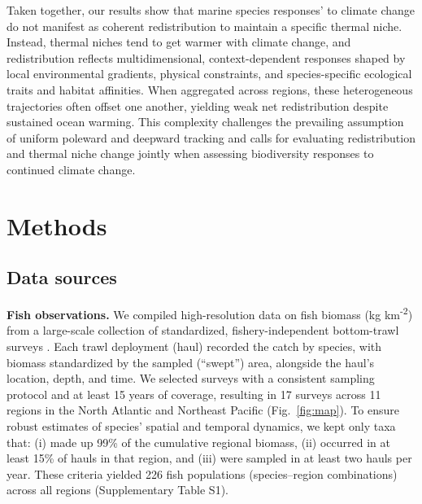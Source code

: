 \documentclass[pdflatex,sn-nature,referee]{sn-jnl}%
\begin{document}
Taken together, our results show that marine species responses' to climate change do not manifest as coherent redistribution to maintain a specific thermal niche. Instead, thermal niches tend to get warmer with climate change, and redistribution reflects multidimensional, context-dependent responses shaped by local environmental gradients, physical constraints, and species-specific ecological traits and habitat affinities. When aggregated across regions, these heterogeneous trajectories often offset one another, yielding weak net redistribution despite sustained ocean warming. This complexity challenges the prevailing assumption of uniform poleward and deepward tracking and calls for evaluating redistribution and thermal niche change jointly when assessing biodiversity responses to continued climate change. %


\section{Methods}\label{methods}

\subsection{Data sources}

\textbf{Fish observations.} We compiled high-resolution data on fish biomass (kg km\textsuperscript{-2}) from 
a large-scale collection of standardized, fishery-independent bottom-trawl surveys \citep{maureaud_fishglob_data_2024}. Each trawl deployment (haul) recorded the catch by species, with biomass standardized by the sampled (``swept'') area, alongside the haul’s location, depth, and time. We selected surveys with a consistent sampling protocol and at least 15 years of coverage, resulting in 17 surveys across 11 regions in the North Atlantic and Northeast Pacific (Fig.~\ref{fig:map}).
To ensure robust estimates of species’ spatial and temporal dynamics, we kept only taxa that: (i) made up 99\% of the cumulative regional biomass, (ii) occurred in at least 15\% of hauls in that region, and (iii) were sampled in at least two hauls per year. These criteria yielded 226 fish populations (species–region combinations) across all regions (Supplementary Table S1).
\end{document}
